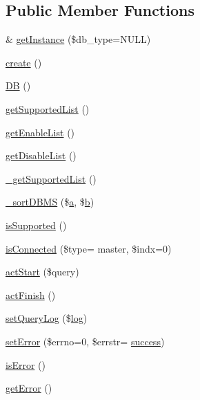 \subsection*{Public Member Functions}
\begin{DoxyCompactItemize}
\item 
\& \hyperlink{classDB_a16f4a668b6429b4b9af5132cbf885213}{get\+Instance} (\$db\+\_\+type=N\+U\+LL)
\item 
\hyperlink{classDB_aad22e845daa75ae9ca9b97f7e3a89749}{create} ()
\item 
\hyperlink{classDB_a29a603c52c10831cddee82518417f992}{DB} ()
\item 
\hyperlink{classDB_a82226ac3fc6365c0771b13e389d216cf}{get\+Supported\+List} ()
\item 
\hyperlink{classDB_a0031322267656e8f6bc7f811ca21198b}{get\+Enable\+List} ()
\item 
\hyperlink{classDB_a65508ca8b2bb4ebf6dbb570caf9c8e40}{get\+Disable\+List} ()
\item 
\hyperlink{classDB_a7b0d1af98d9f53968631ca789d6d755c}{\+\_\+get\+Supported\+List} ()
\item 
\hyperlink{classDB_ab0a6d97fa16de74b4d991c9a4d633718}{\+\_\+sort\+D\+B\+MS} (\$\hyperlink{jqplot_8barRenderer_8min_8js_a15f14caa0c9de3a415d8eb9d88378fc0}{a}, \$\hyperlink{jqplot_8barRenderer_8min_8js_a2fc619a5cd76c0e5c2bd9f57a6fcbd3e}{b})
\item 
\hyperlink{classDB_a7517481bc9d24ad659f8d347688e481b}{is\+Supported} ()
\item 
\hyperlink{classDB_a217cc2096613d1758a9851f1dd990d71}{is\+Connected} (\$type= \textquotesingle{}master\textquotesingle{}, \$indx=0)
\item 
\hyperlink{classDB_a51a1ba94763a8211495eac18d74c80bb}{act\+Start} (\$query)
\item 
\hyperlink{classDB_a79cad647912ef780e967819e6346a742}{act\+Finish} ()
\item 
\hyperlink{classDB_a0adb7f453d6e8ed2e491d6708be7f9ec}{set\+Query\+Log} (\$\hyperlink{jquery-1_8x_8min_8js_aab8655c63335be4154bdc4165547623e}{log})
\item 
\hyperlink{classDB_af2584546ee78d07a40cc16493f8797cc}{set\+Error} (\$errno=0, \$errstr= \textquotesingle{}\hyperlink{jquery_8oembed_8js_a20d50bae920793dd76c2f5b4c6fd9803}{success}\textquotesingle{})
\item 
\hyperlink{classDB_ab1433763c6378f1085606424a1bfe27c}{is\+Error} ()
\item 
\hyperlink{classDB_a3956fe8725f824d8c0a4f3cba449d6df}{get\+Error} ()

\end{DoxyCompactItemize}

